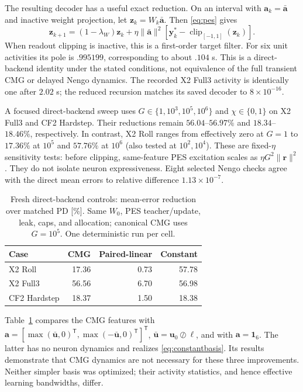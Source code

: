 \documentclass[letterpaper, 10 pt, conference]{ieeeconf}
\newcommand{\T}{^{\mathsf T}}
\newcommand{\clip}{\operatorname{clip}}
\begin{document}
The resulting decoder has a useful exact reduction. On an interval with
$\bm a_k=\bar{\bm a}$ and inactive weight projection, let
$\bm z_k=W_k\bar{\bm a}$. Then \eqref{eq:pes} gives
\begin{equation}
 \bm z_{k+1}=(1-\lambda_W)\bm z_k+
 \eta\|\bar{\bm a}\|^2[\bm y_k^*-\clip_{[-1,1]}(\bm z_k)].
 \label{eq:constantbasis}
\end{equation}
When readout clipping is inactive, this is a first-order target filter.
For six unit activities its pole is $.995199$, corresponding to about
$.104$ s. This is a direct-backend identity under the stated conditions,
not equivalence of the full transient CMG or delayed Nengo dynamics.
The recorded X2 Full3 activity is identically one after $2.02$ s; the
reduced recursion matches its saved decoder to $8\times10^{-16}$.

A focused direct-backend sweep uses $G\in\{1,10^3,10^5,10^6\}$ and
$\chi\in\{0,1\}$ on X2 Full3 and CF2 Hardstep. Their reductions remain
$56.04$--$56.97\%$ and $18.34$--$18.46\%$, respectively. In contrast,
X2 Roll ranges from effectively zero at $G=1$ to $17.36\%$ at $10^5$
and $57.76\%$ at $10^6$ (also tested at $10^2,10^4$).
These are fixed-$\eta$ sensitivity tests: before clipping, same-feature
PES excitation scales as $\eta G^2\|\bm r\|^2$. They do not isolate
neuron expressiveness. Eight selected Nengo checks agree with the direct
mean errors to relative difference $1.13\times10^{-7}$.

\begin{table}[t]
\centering\footnotesize
\caption{Fresh direct-backend controls: mean-error reduction over matched
PD [\%]. Same $W_0$, PES teacher/update, leak, caps, and allocation;
canonical CMG uses $G=10^5$. One deterministic run per cell.}
\label{tab:simplebasis}
\setlength{\tabcolsep}{4pt}
\begin{tabular}{lrrr}
\toprule
Case & CMG & Paired-linear & Constant\\\midrule
X2 Roll &17.36&0.73&57.78\\
X2 Full3 &56.56&6.70&56.98\\
CF2 Hardstep &18.37&1.50&18.38\\\bottomrule
\end{tabular}
\end{table}
Table~\ref{tab:simplebasis} compares the CMG features with
$\bm a=[\max(\bar{\bm u},0)\T,\max(-\bar{\bm u},0)\T]\T$,
$\bar{\bm u}=\bm u_0\oslash\bm\ell$, and with $\bm a=\bm1_6$.
The latter has no neuron dynamics and realizes \eqref{eq:constantbasis}.
Its results demonstrate that CMG dynamics are not necessary for these
three improvements. Neither simpler basis was optimized; their activity
statistics, and hence effective learning bandwidths, differ.
\end{document}
